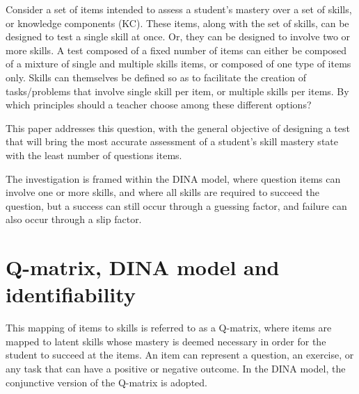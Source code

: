 \documentclass{edm_template}
\begin{document}
Consider a set of items intended to assess a student's mastery over a set of skills, or knowledge components (KC).  These items, along with the set of skills, can be designed to test a single skill at once.  Or, they can be designed to involve two or more skills.  A test composed of a fixed number of items can either be composed of a mixture of single and multiple skills items, or composed of one type of items only.  Skills can themselves be defined so as to facilitate the creation of tasks/problems that involve single skill per item, or multiple skills per items.  By which principles should a teacher choose among these different options?

This paper addresses this question, with the general objective of designing a test that will bring the most accurate assessment of a student's skill mastery state with the least number of questions items.  

The investigation is framed within the DINA model, where question items can involve one or more skills, and where all skills are required to succeed the question, but a success can still occur through a guessing factor, and failure can also occur through a slip factor.  


\section{Q-matrix, DINA model and identifiability}

This mapping of items to skills is referred to as a Q-matrix, where items are mapped to latent skills whose mastery is deemed necessary in order for the student to succeed at the items.  An item can represent a question, an exercise, or any task that can have a positive or negative outcome.  In the DINA model, the conjunctive version of the Q-matrix is adopted.
\end{document}
